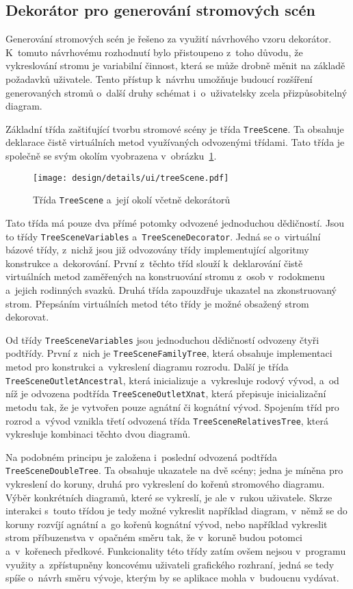 		\subsection*{Dekorátor pro generování stromových scén}
		Generování stromových scén je řešeno za využití návrhového vzoru dekorátor. K~tomuto návrhovému rozhodnutí bylo přistoupeno z~toho důvodu, že vykreslování stromu je variabilní činnost, která se může drobně měnit na základě požadavků uživatele. Tento přístup k~návrhu umožňuje budoucí rozšíření generovaných stromů o~další druhy schémat i~o~uživatelsky zcela přizpůsobitelný diagram.\par
		Základní třída zaštiťující tvorbu stromové scény je třída \texttt{TreeScene}. Ta obsahuje deklarace čistě virtuálních metod využívaných odvozenými třídami. Tato třída je společně se svým okolím vyobrazena v~obrázku~\ref{fig:designDetailTreeScene}. \par
		\begin{figure}[h]
			\centering
			\texttt{[image: design/details/ui/treeScene.pdf]}
			\caption{Třída \texttt{TreeScene} a~její okolí včetně dekorátorů}
			\label{fig:designDetailTreeScene}
		\end{figure}
		Tato třída má pouze dva přímé potomky odvozené jednoduchou dědičností. Jsou to třídy \texttt{TreeSceneVariables} a~\texttt{TreeSceneDecorator}. Jedná se o~virtuální bázové třídy, z~nichž jsou již odvozovány třídy implementující algoritmy konstrukce a~dekorování. První z~těchto tříd slouží k~deklarování čistě virtuálních metod zaměřených na konstruování stromu z~osob v~rodokmenu a~jejich rodinných svazků. Druhá třída zapouzdřuje ukazatel na zkonstruovaný strom. Přepsáním virtuálních metod této třídy je možné obsažený strom dekorovat. \par
		Od třídy \texttt{TreeSceneVariables} jsou jednoduchou dědičností odvozeny čtyři podtřídy. První z~nich je \texttt{TreeSceneFamilyTree}, která obsahuje implementaci metod pro konstrukci a~vykreslení diagramu rozrodu.  Další je třída \texttt{TreeSceneOutletAncestral}, která inicializuje a~vykresluje rodový vývod, a~od níž je odvozena podtřída \texttt{TreeSceneOutletXnat}, která přepisuje inicializační metodu tak, že je vytvořen pouze agnátní či kognátní vývod. Spojením tříd pro rozrod a~vývod vznikla třetí odvozená třída \texttt{TreeSceneRelativesTree}, která vykresluje kombinaci těchto dvou diagramů. \par
		Na podobném principu je založena i~poslední odvozená podtřída \texttt{TreeSceneDoubleTree}. Ta obsahuje ukazatele na dvě scény; jedna je míněna pro vykreslení do koruny, druhá pro vykreslení do kořenů stromového diagramu. Výběr konkrétních diagramů, které se vykreslí, je ale v~rukou uživatele. Skrze interakci s~touto třídou je tedy možné vykreslit například diagram, v~němž se do koruny rozvíjí agnátní a~go kořenů kognátní vývod, nebo například vykreslit strom příbuzenstva v~opačném směru tak, že v~koruně budou potomci a~v~kořenech předkové. Funkcionality této třídy zatím ovšem nejsou v~programu využity a~zpřístupněny koncovému uživateli grafického rozhraní, jedná se tedy spíše o~návrh směru vývoje, kterým by se aplikace mohla v~budoucnu vydávat.\par
